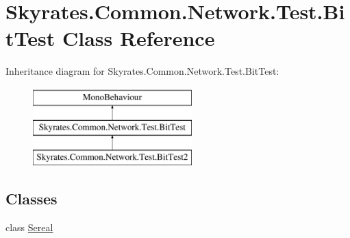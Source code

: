 \hypertarget{class_skyrates_1_1_common_1_1_network_1_1_test_1_1_bit_test}{\section{Skyrates.\-Common.\-Network.\-Test.\-Bit\-Test Class Reference}
\label{class_skyrates_1_1_common_1_1_network_1_1_test_1_1_bit_test}
}
Inheritance diagram for Skyrates.\-Common.\-Network.\-Test.\-Bit\-Test\-:\begin{figure}[H]
\begin{center}
\leavevmode
\includegraphics[height=3.000000cm]{class_skyrates_1_1_common_1_1_network_1_1_test_1_1_bit_test}
\end{center}
\end{figure}
\subsection*{Classes}
\begin{DoxyCompactItemize}
\item 
class \hyperlink{class_skyrates_1_1_common_1_1_network_1_1_test_1_1_bit_test_1_1_sereal}{Sereal}
\end{DoxyCompactItemize}
